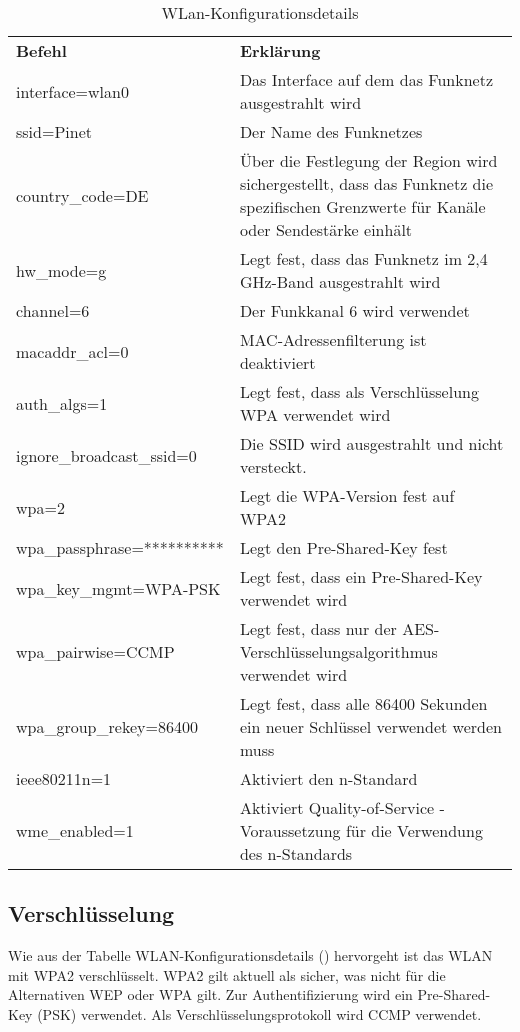 \begin{table}
\caption{WLan-Konfigurationsdetails}
\label{tab:WLAN-Konfiguration}
\begin{tabular}{p{} p{}}
\textbf{Befehl} & \textbf{Erklärung} \\
interface=wlan0 & Das Interface auf dem das Funknetz ausgestrahlt wird \\
ssid=Pinet 		& Der Name des Funknetzes \\
country\_code=DE & Über die Festlegung der Region wird sichergestellt, dass das
Funknetz die spezifischen Grenzwerte für Kanäle oder Sendestärke einhält \\
hw\_mode=g 		& Legt fest, dass das Funknetz im 2,4 GHz-Band ausgestrahlt wird \\
channel=6 		& Der Funkkanal 6 wird verwendet \\
macaddr\_acl=0 	& MAC-Adressenfilterung ist deaktiviert \\
auth\_algs=1 	& Legt fest, dass als Verschlüsselung WPA verwendet wird \\
ignore\_broadcast\_ssid=0 & Die SSID wird ausgestrahlt und nicht versteckt. \\
wpa=2 & Legt die WPA-Version fest auf WPA2 \\
wpa\_passphrase=********** & Legt den Pre-Shared-Key fest \\
wpa\_key\_mgmt=WPA-PSK 	& Legt fest, dass ein Pre-Shared-Key verwendet wird \\
wpa\_pairwise=CCMP 		& Legt fest, dass nur der AES-Verschlüsselungsalgorithmus
verwendet wird \\
wpa\_group\_rekey=86400 & Legt fest, dass alle 86400 Sekunden ein neuer
Schlüssel verwendet werden muss \\
ieee80211n=1 	& Aktiviert den n-Standard \\
wme\_enabled=1 & Aktiviert Quality-of-Service - Voraussetzung für die Verwendung
des n-Standards \\
 \end{tabular}
\end{table}

\subsection{Verschlüsselung}

Wie aus der Tabelle WLAN-Konfigurationsdetails () hervorgeht ist das WLAN mit WPA2 verschlüsselt. WPA2 gilt aktuell als sicher, was nicht für die Alternativen WEP oder WPA gilt. Zur Authentifizierung wird ein Pre-Shared-Key (PSK) verwendet. Als Verschlüsselungsprotokoll wird CCMP verwendet. 

